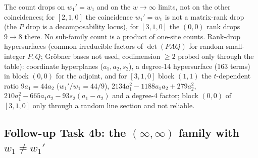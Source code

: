 \documentclass[10pt]{article}
\begin{document}
The count drops on $w_1'=w_1$ and on the $w\to\infty$ limits, not on the other coincidences; for $[2,1,0]$ the coincidence $w_1'=w_1$ is not a matrix-rank drop (the $P$ drop is a decomposability locus), for $[3,1,0]$ the $(0,\allowbreak 0)$ rank drops $9\to8$ there. No sub-family count is a product of one-site counts. Rank-drop hypersurfaces (common irreducible factors of $\det(PAQ)$ for random small-integer $P,Q$; Gr\"obner bases not used, codimension $\ge2$ probed only through the table): coordinate hyperplanes ($a_1,a_2,s_2$), a degree-14 hypersurface (163 terms) in block $(0,\allowbreak 0)$ for the adjoint, and for $[3,1,0]$ block $(1,\allowbreak 1)$ the $t$-dependent ratio $9a_1=44a_2$ ($w_1'/w_1=44/9$), $2134a_1^2-1188a_1a_2+279a_2^2$, $210a_1^2-665a_1a_2-93s_2(a_1-a_2)$ and a degree-4 factor; block $(0,\allowbreak 0)$ of $[3,1,0]$ only through a random line section and not reliable.

\subsection{Follow-up Task 4b: the $(\infty,\infty)$ family with $w_1\neq w_1'$}\label{sec:B4b}
\end{document}
